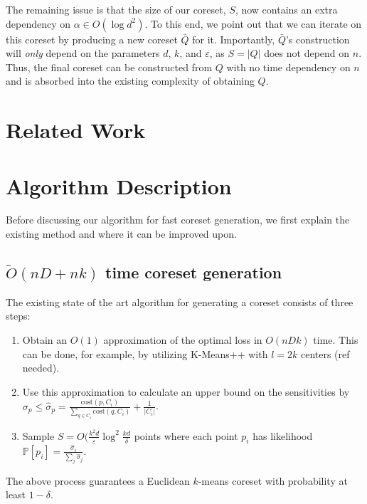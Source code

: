 \documentclass{article}
\theoremstyle{definition}
\begin{document}
The remaining issue is that the size of our coreset, $S$, now contains an extra dependency on $\alpha \in O(\log d^2)$. To this end, we point out that we can
iterate on this coreset by producing a new coreset $\bar{Q}$ for it. Importantly, $\bar{Q}$'s construction will \emph{only} depend on the parameters $d$, $k$,
and $\varepsilon$, as $S = |Q|$ does not depend on $n$. Thus, the final coreset can be constructed from $Q$ with no time dependency on $n$ and is absorbed into
the existing complexity of obtaining $Q$.

\section{Related Work}

\section{Algorithm Description}

Before discussing our algorithm for fast coreset generation, we first explain the existing method and where it can be improved upon.

\subsection{$\tilde{O}(nD + nk)$ time coreset generation}

The existing state of the art algorithm for generating a coreset consists of three steps:
\begin{enumerate}
    \item
        Obtain an $O(1)$ approximation of the optimal loss in $O(nDk)$ time. This can be done, for example, by utilizing K-Means++ with $l=2k$ centers (ref
        needed).
    \item
        Use this approximation to calculate an upper bound on the sensitivities by $\sigma_p \leq \hat{\sigma}_p = \frac{\text{cost}(p, C_i)}{\sum_{q \in C_i}
        \text{cost}(q, C_i)} + \frac{1}{|C_i|}$.
    \item 
        Sample $S = O(\frac{k^2d}{\varepsilon}\log^2\frac{kd}{\delta}$ points where each point $p_i$ has likelihood $\mathbb{P}[p_i]
        = \frac{\hat{\sigma}_i}{\sum_j \hat{\sigma}_j}$.
\end{enumerate}

The above process guarantees a Euclidean $k$-means coreset with probability at least $1 - \delta$.
\end{document}
